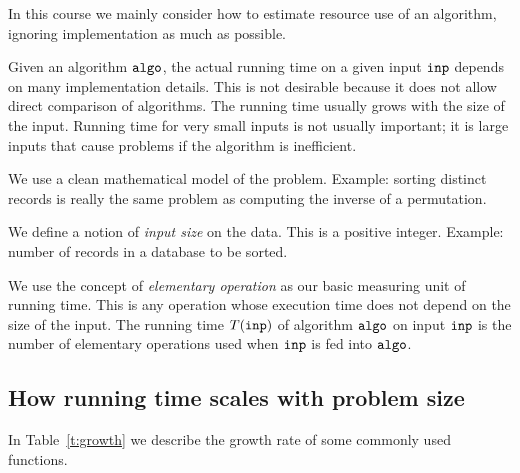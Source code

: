 In this course we mainly consider how to estimate resource use of an algorithm, 
ignoring implementation as much as possible.  

Given an algorithm $\algo$, the actual running time on a given
input $\inp$ depends on many implementation details. This is not desirable
because it does not allow direct comparison of algorithms. 
The running time usually grows with the size of the input.
Running time for very small inputs is not usually important; it is large
inputs that cause problems if the algorithm is inefficient. 

We use a clean mathematical model of the problem. Example: sorting 
distinct records is really the same problem as computing the inverse of a 
permutation. 

We define a notion of  \emph{input size} on the data. This is a positive integer. 
Example: number of records in a database to be sorted.

We use the concept of \emph{elementary operation} as our basic measuring 
unit of running time. This is any operation whose execution time does not depend on the size of the input.
The running time $T(\inp)$ of algorithm $\algo$ on input $\inp$ is the 
number of elementary operations used when $\inp$ is fed into $\algo$.



\subsection{How running time scales with problem size}
In Table~\ref{t:growth} we describe the growth rate of some commonly used functions.

